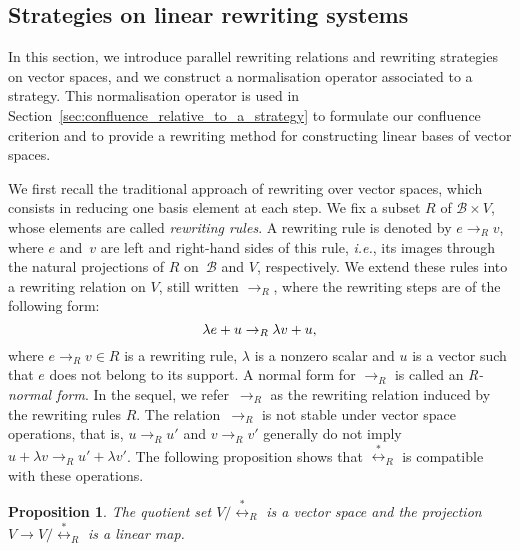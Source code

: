 \documentclass[10pt]{easychair}
\newtheorem{proposition}[theorem]{Proposition}
\theoremstyle{definition}
\newcommand\ie{\emph{i.e.}}
\newcommand\basis{\mathscr{B}}
\newcommand\rewR{\to_R}
\newcommand\equivR{\overset{*}{\leftrightarrow}_R}
\begin{document}
\subsection{Strategies on linear rewriting systems}
\label{sec:strategies_on_linear_rewriting_systems}

In this section, we introduce parallel rewriting relations and rewriting
strategies on vector spaces, and we construct a normalisation operator
associated to a strategy. This normalisation operator is used in
Section~\ref{sec:confluence_relative_to_a_strategy} to formulate our
confluence criterion and to provide a rewriting method for constructing
linear bases of vector spaces. 
\medskip

We first recall the traditional approach of rewriting over vector spaces,
which consists in reducing one basis element at each step. We fix a
subset $R$ of $\basis\times V$, whose elements are called
{\em rewriting rules}. A rewriting rule is denoted by $e\rewR v$, where
$e$ and~$v$ are left and right-hand sides of this rule, \ie, its images
through the natural projections of $R$  on~$\basis$ and $V$,
respectively. We extend these rules into a rewriting relation on $V$,
still written $\rewR$, where the rewriting steps are of the following
form: 
\begin{equation}\label{equ:R_rewriting_step}
  \lambda e+u\rewR\lambda v+u,
  \smallskip
\end{equation}
where $e\rewR v\in R$ is a rewriting rule, $\lambda$ is a nonzero scalar
and $u$ is a vector such that $e$ does not belong to its support. A
normal form for $\rewR$ is called an {\em R-normal form}. In the sequel, 
we refer~$\rewR$ as the rewriting relation induced by the rewriting rules
$R$. The relation~$\rewR$ is not stable under vector space
operations, that is, $u\rewR u'$ and $v\rewR v'$ generally do not imply 
$u+\lambda v\rewR u'+\lambda v'$. The following proposition shows that
$\equivR$ is compatible with these operations.
\smallskip

\begin{proposition}\label{prop:vs_structure}
  The quotient set $V/\equivR$ is a vector space and the projection
  $V\to V/\equivR$ is a linear map.
\end{proposition}
\end{document}
